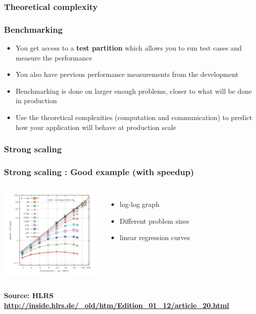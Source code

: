 \subsubsection{Theoretical complexity}


\begin{frame}[containsverbatim]
	\frametitle{Benchmarking}


\begin{itemize}
	\item { You get access to a \textbf{test partition} which allows you to run test cases and measure the performance }
	\item { You also have previous performance measurements from the development }
	\item { Benchmarking is done on larger enough problems, closer to what will be done in production }
	\item { Use the theoretical complexities (computation and communication) to predict how your application will behave at production scale }
\end{itemize}
\end{frame}



\subsubsection{Strong scaling}


\begin{frame}[containsverbatim]
	\frametitle{Strong scaling : Good example (with speedup)}

\begin{columns}
\begin{center}
\includegraphics[width=5cm]{Day4/images/strong-good2.png}
\end{center}

\begin{itemize}
	\item {log-log graph}
	\item {Different problem sizes}
	\item {linear regression curves}
\end{itemize}
\end{columns}
\textbf{Source: HLRS \url{http://inside.hlrs.de/_old/htm/Edition_01_12/article_20.html}}

\end{frame}


